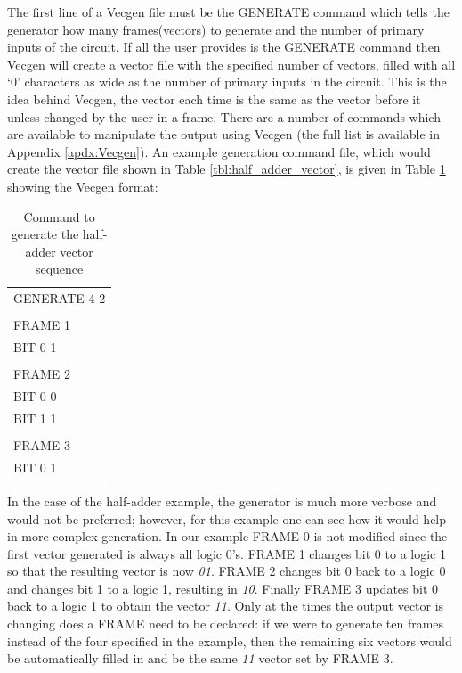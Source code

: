 \documentclass[12pt]{report}
\begin{document}
The first line of a Vecgen file must be the GENERATE command which tells the generator how many frames(vectors) to generate and the number of primary inputs of the circuit.  If all the user provides is the GENERATE command then Vecgen will create a vector file with the specified number of vectors, filled with all `0' characters as wide as the number of primary inputs in the circuit.  This is the idea behind Vecgen, the vector each time is the same as the vector before it unless changed by the user in a frame.  There are a number of commands which are available to manipulate the output using Vecgen (the full list is available in Appendix \ref{apdx:Vecgen}).  An example generation command file, which would create the vector file shown in Table \ref{tbl:half_adder_vector}, is given in Table \ref{tbl:Vecgen_example} showing the Vecgen format:
\begin{table}
	\label{tbl:Vecgen_example}
	\begin{center}
		\begin{tabular}{l}
			GENERATE 4 2 \\		
			\\
			FRAME 1	\\
			BIT 0 1	\\
			\\
			FRAME 2	\\
			BIT 0 0	\\
			BIT 1 1	\\
			\\
			FRAME 3	\\
			BIT 0 1	\\
		\end{tabular}
	\end{center}
	\caption{Command to generate the half-adder vector sequence}
\end{table}
In the case of the half-adder example, the generator is much more verbose and would not be preferred; however, for this example one can see how it would help in more complex generation.  In our example FRAME 0 is not modified since the first vector generated is always all logic 0's.  FRAME 1 changes bit 0 to a logic 1 so that the resulting vector is now \textit{01}.  FRAME 2 changes bit 0 back to a logic 0 and changes bit 1 to a logic 1, resulting in \textit{10}.  Finally FRAME 3 updates bit 0 back to a logic 1 to obtain the vector \textit{11}.  Only at the times the output vector is changing does a FRAME need to be declared: if we were to generate ten frames instead of the four specified in the example, then the remaining six vectors would be automatically filled in and be the same \textit{11} vector set by FRAME 3.
\end{document}
